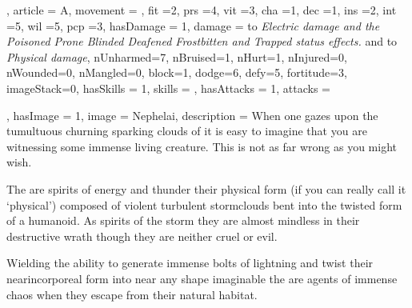 {{

, article = A, movement = , fit =2, prs =4, vit =3, cha =1, dec =1, ins =2, int =5, wil =5, pcp =3, hasDamage = 1, damage = to \textit{Electric damage and the Poisoned\comma{} Prone\comma{} Blinded\comma{} Deafened\comma{} Frostbitten and Trapped status effects.} and  to \textit{Physical damage}, nUnharmed=7, nBruised=1, nHurt=1, nInjured=0, nWounded=0, nMangled=0, block=1, dodge=6, defy=5, fortitude=3, imageStack=0, hasSkills = 1, skills = 
, hasAttacks = 1, attacks = 


, hasImage = 1, image = Nephelai, description = When one gazes upon the tumultuous\comma{} churning\comma{} sparking clouds of \comma{} it is easy to imagine that you are witnessing some immense\comma{} living creature. This is not as far wrong as you might wish. 

The \name{} are spirits of energy and thunder\comma{} their physical form (if you can really call it `physical’) composed of violent\comma{} turbulent stormclouds\comma{} bent into the twisted form of a humanoid. As spirits of the storm\comma{} they are almost mindless in their destructive wrath\comma{} though they are neither cruel or evil. 

Wielding the ability to generate immense bolts of lightning\comma{} and twist their near\minus{}incorporeal form into near any shape imaginable\comma{} the \name{} are agents of immense chaos when they escape from their natural habitat.}

}




